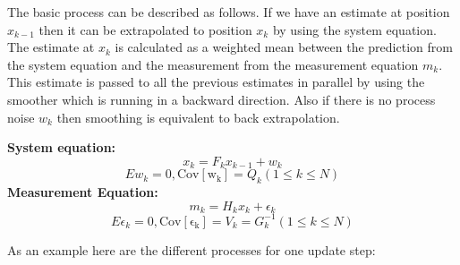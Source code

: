 The basic process can be described as follows. If we have an estimate at position $x_{k-1}$ then it can be extrapolated to position $x_k$ by using the system equation. The estimate at $x_k$ is calculated as a weighted mean between the prediction from the system equation and the measurement from the measurement equation $m_k$. This estimate is passed to all the previous estimates in parallel by using the smoother which is running in a backward direction. Also if there is no process noise $w_k$ then smoothing is equivalent to back extrapolation.

\textbf{System equation:}
\begin{equation}
  x_k = F_k x_{k-1} + w_{k}
\end{equation}
\begin{equation}
  E{w_k} = 0,  \mathrm{Cov[w_k]} = Q_k (1\leq k \leq N)
\end{equation}
\textbf{Measurement Equation:}
\begin{equation}
  m_k = H_k x_{k} + \epsilon_{k}
\end{equation}
\begin{equation}
  E{\epsilon_k} = 0,  \mathrm{Cov[\epsilon_k]} = V_k = G_k^{-1} (1\leq k \leq N)
\end{equation}

As an example here are the different processes for one update step:

